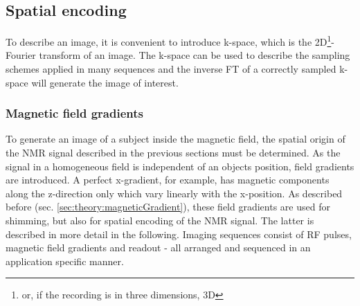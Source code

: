         \subsection{Spatial encoding}
            To describe an image, it is convenient to introduce k-space, which is the 2D\footnote[1]{or, if the recording is in three dimensions, 3D}-Fourier transform of an image. The k-space can be used to describe the sampling schemes applied in many sequences and the inverse FT of a correctly sampled k-space will generate the image of interest.
        \subsubsection{Magnetic field gradients}
            To generate an image of a subject inside the magnetic field, the spatial origin of the NMR signal described in the previous sections must be determined. As the signal in a homogeneous field is independent of an objects position, field gradients are introduced. A perfect x-gradient, for example, has magnetic components along the z-direction only which vary linearly with the x-position. As described before (sec. \ref{sec:theory:magneticGradient}), these field gradients are used for shimming, but also for spatial encoding of the NMR signal. The latter is described in more detail in the following. Imaging sequences consist of RF pulses, magnetic field gradients and readout - all arranged and sequenced in an application specific manner.

